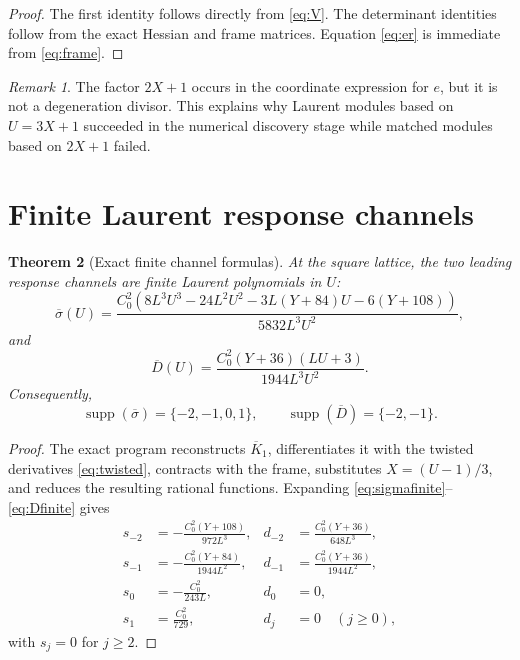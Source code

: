 \documentclass[11pt]{article}
\newtheorem{theorem}{Theorem}[section]
\theoremstyle{definition}
\theoremstyle{remark}
\newtheorem{remark}[theorem]{Remark}
\newcommand{\bK}{\overline{K}}
\newcommand{\bsigma}{\overline{\sigma}}
\newcommand{\bD}{\overline{D}}
\newcommand{\supp}{\operatorname{supp}}
\begin{document}
\begin{proof}
The first identity follows directly from \eqref{eq:V}.  The determinant identities follow from the exact Hessian and frame matrices.  Equation \eqref{eq:er} is immediate from \eqref{eq:frame}.
\end{proof}

\begin{remark}
The factor $2X+1$ occurs in the coordinate expression for $e$, but it is not a degeneration divisor.  This explains why Laurent modules based on $U=3X+1$ succeeded in the numerical discovery stage while matched modules based on $2X+1$ failed.
\end{remark}

\section{Finite Laurent response channels}

\begin{theorem}[Exact finite channel formulas]\label{thm:channels}
At the square lattice, the two leading response channels are finite Laurent polynomials in $U$:
\begin{equation}\label{eq:sigmafinite}
 \bsigma(U)=
 \frac{C_0^2\left(
 8L^3U^3-24L^2U^2-3L(Y+84)U-6(Y+108)
 \right)}{5832L^3U^2},
\end{equation}
and
\begin{equation}\label{eq:Dfinite}
 \bD(U)=
 \frac{C_0^2(Y+36)(LU+3)}{1944L^3U^2}.
\end{equation}
Consequently,
\begin{equation}\label{eq:supportchannels}
 \supp(\bsigma)=\{-2,-1,0,1\},
 \qquad
 \supp(\bD)=\{-2,-1\}.
\end{equation}
\end{theorem}

\begin{proof}
The exact program reconstructs $\bK_1$, differentiates it with the twisted derivatives \eqref{eq:twisted}, contracts with the frame, substitutes $X=(U-1)/3$, and reduces the resulting rational functions.  Expanding \eqref{eq:sigmafinite}--\eqref{eq:Dfinite} gives
\begin{align}
 s_{-2}&=-\frac{C_0^2(Y+108)}{972L^3},
 &d_{-2}&=\frac{C_0^2(Y+36)}{648L^3},\label{eq:leadingcoeffs}\\
 s_{-1}&=-\frac{C_0^2(Y+84)}{1944L^2},
 &d_{-1}&=\frac{C_0^2(Y+36)}{1944L^2},\label{eq:nextcoeffs}\\
 s_0&=-\frac{C_0^2}{243L},
 &d_0&=0,\label{eq:constantcoeffs}\\
 s_1&=\frac{C_0^2}{729},
 &d_j&=0\quad(j\ge0),\label{eq:positivecoeffs}
\end{align}
with $s_j=0$ for $j\ge2$.
\end{proof}
\end{document}
